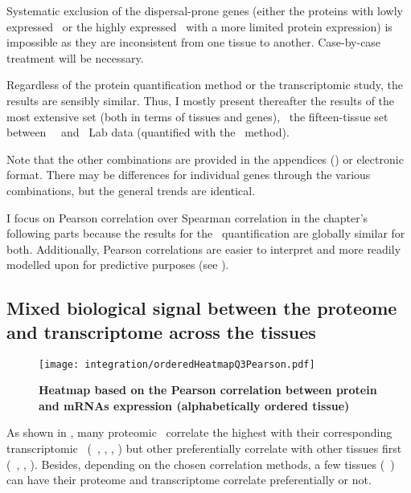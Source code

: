 Systematic exclusion of the dispersal-prone genes
(either the proteins with lowly expressed \mRNAs\
or the highly expressed \mRNAs\ with a more limited protein expression)
is impossible
as they are inconsistent from one tissue to another.\label{memo:dispersedGenes}
Case-by-case treatment will be necessary.

Regardless of the protein quantification method or
the transcriptomic study, %
the results are sensibly similar.
Thus, I mostly present thereafter the results of the most extensive set
(both in terms of tissues and genes),
\ie\ the fifteen-tissue set between \uhlen\ \etal\ and \pandey\ Lab data
(quantified with the \PPKM\ method).\mybr\

Note that the other combinations are provided
in the appendices ()
or electronic format.
There may be differences for individual genes through the various combinations,
but the general trends are identical.

I focus on Pearson correlation over Spearman correlation\label{seg:pearOverSpear}
in the chapter's following parts
because the results for the \PPKM\ quantification are globally similar for both.
Additionally, Pearson correlations are easier to interpret
and more readily modelled upon for predictive purposes
(see ).\mybr\

\subsection{Mixed biological signal between the proteome and transcriptome
across the tissues}

\begin{figure}[!hbt]
    \texttt{[image: integration/orderedHeatmapQ3Pearson.pdf]}\centering
    \vspace{-3mm}
    \caption[Heatmap based on the Pearson correlation between protein and mRNAs
    expression (alphabetically ordered tissue)]{\label{fig:orderedHeatmapPearson}%
    \textbf{Heatmap based on the Pearson correlation between protein and mRNAs
    expression (alphabetically ordered tissue)}}
\end{figure}

As shown in ,
many proteomic \treps\ correlate the highest with
their corresponding transcriptomic \trep\
(\eg\ \liver, \testis, \ovary, \pancreas)
but other preferentially correlate with other tissues first
(\eg\ \bladder, \Oesophagus, \gallbladder).
Besides, depending on the chosen correlation methods,
a few tissues (\eg\ \heart) can have
their proteome and transcriptome correlate preferentially or not.\\
\vspace{-\baselineskip}

